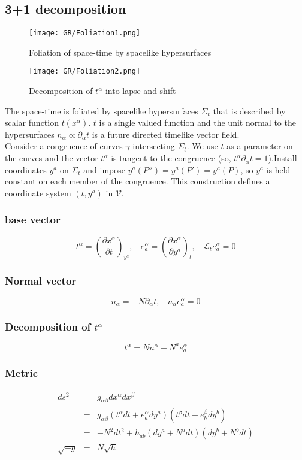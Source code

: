 \subsection{3+1 decomposition}
\begin{figure}[!h]
\begin{minipage}[t]{0.5\linewidth}
\centering
\texttt{[image: GR/Foliation1.png]}
\caption{Foliation of space-time by spacelike hypersurfaces}
\label{fig:side:a}
\end{minipage}%
\begin{minipage}[t]{0.5\linewidth}
\centering
\texttt{[image: GR/Foliation2.png]}
\caption{Decomposition of $t^{\alpha}$ into lapse and shift}
\label{fig:side:b}
\end{minipage}
\end{figure}
\noindent
The space-time is foliated by spacelike hypersurfaces $\Sigma_t$ that is described by scalar function $t(x^{\alpha})$. $t$ is a single valued function and the unit normal to the hypersurfaces $n_{\alpha} \propto \partial_{\alpha} t$ is a future directed timelike vector field.\\
Consider a congruence of curves $\gamma$ intersecting $\Sigma_t$. We use $t$ as a parameter on the curves and the vector $t^{\alpha}$ is tangent to the congruence (so, $t^{\alpha} \partial_{\alpha}t = 1$).Install coordinates $y^a$ on $\Sigma_t$ and impose $y^a(P'') = y^a(P') = y^a(P)$, so $y^a$ is held constant on each member of the congruence. This construction defines a coordinate system $(t,y^a)$ in $\mathcal{V}$.\\
\subsubsection{base vector}
\[t^{\alpha} = \left( \frac{\partial x^{\alpha}}{\partial t}\right)_{y^a}, \ \ \ \ e_a^{\alpha} = \left(\frac{\partial x^{\alpha}}{\partial y^a} \right)_t, \ \ \ \ \mathcal{L}_t e_a^{\alpha} = 0\]
\subsubsection{Normal vector}
\[n_{\alpha} = -N \partial_{\alpha}t, \ \ \ \ n_{\alpha} e_a^{\alpha} = 0\]
\subsubsection{Decomposition of $t^{\alpha}$}
\[t^{\alpha} = N n^{\alpha} + N^a e_a^{\alpha}\]
\subsubsection{Metric}
\begin{eqnarray}
ds^2 &=& g_{\alpha \beta} dx^{\alpha} dx^{\beta} \nonumber \\
&=& g_{\alpha \beta} (t^{\alpha} dt + e_a^{\alpha}dy^a) (t^{\beta} dt + e_b^{\beta}dy^{b}) \nonumber \\
&=& -N^2 dt^2 + h_{ab}(dy^a+N^a dt)(dy^b + N^b dt) \nonumber \\
\sqrt{-g} &=& N \sqrt{h} \nonumber
\end{eqnarray}

